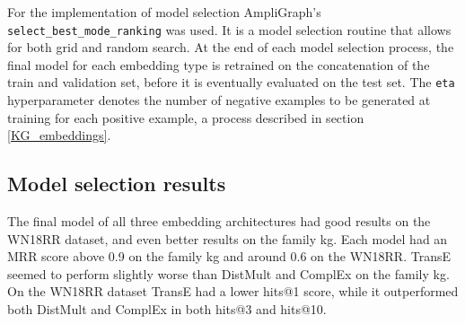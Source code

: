 For the implementation of model selection AmpliGraph's \texttt{select\_best\_mode\_ranking} was used. It is a model selection routine that allows for both grid and random search. At the end of each model selection process, the final model for each embedding type is retrained on the concatenation of the train and validation set, before it is eventually evaluated on the test set. The \texttt{eta} hyperparameter denotes the number of negative examples to be generated at training for each positive example, a process described in section \ref{KG_embeddings}. %

\subsection{Model selection results}
The final model of all three embedding architectures had good results on the WN18RR dataset, and even better results on the family \gls{kg}. Each model had an MRR score above 0.9 on the family \gls{kg} and around 0.6 on the WN18RR. TransE seemed to perform slightly worse than DistMult and ComplEx on the family \gls{kg}. On the WN18RR dataset TransE had a lower hits@1 score, while it outperformed both DistMult and ComplEx in both hits@3 and hits@10.
